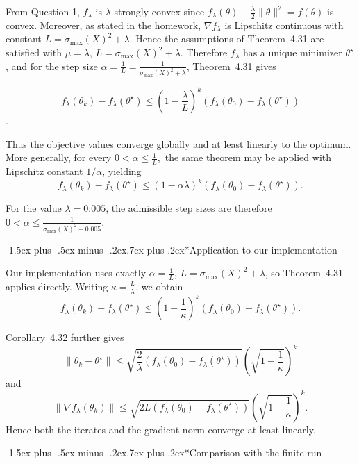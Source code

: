 \documentclass[11pt,a4paper]{article}
\makeatletter
\renewcommand\subsection{\@startsection{subsection}{2}{\z@}%
  {-1.5ex plus -.5ex minus -.2ex}{.7ex plus .2ex}{\normalfont\large\bfseries}}
\makeatother
\begin{document}
From Question 1, \(f_\lambda\) is \(\lambda\)-strongly convex since
\(f_\lambda(\theta)-\frac{\lambda}{2}\|\theta\|^2=f(\theta)\)
is convex. Moreover, as stated in the homework,
\(\nabla f_\lambda\)
is Lipschitz continuous with constant
$L=\sigma_{\max}(X)^2+\lambda$.
Hence the assumptions of Theorem~4.31 are satisfied with
$\mu=\lambda, \, L=\sigma_{\max}(X)^2+\lambda$.
%
Therefore $f_\lambda$ has a unique minimizer $\theta^\star$, and
for the step size
\(\alpha=\frac{1}{L} = \frac{1}{\sigma_{\max}(X)^2+\lambda}\),
Theorem~4.31 gives

\vspace*{-5pt}
$$f_\lambda(\theta_k)-f_\lambda(\theta^\star)
\leq
\left(1-\frac{\lambda}{L}\right)^k
\left(
f_\lambda(\theta_0)-f_\lambda(\theta^\star)
\right)$$.
\vspace*{-7pt}

\noindent Thus the objective values converge globally and at least linearly to
the optimum.
%
More generally, for every
\(0<\alpha\leq\frac{1}{L},\)
the same theorem may be applied with Lipschitz constant \(1/\alpha\),
yielding
\[
f_\lambda(\theta_k)-f_\lambda(\theta^\star)
\leq
(1-\alpha\lambda)^k
\left(
f_\lambda(\theta_0)-f_\lambda(\theta^\star)
\right).
\]

\noindent For the value \(\lambda=0.005\), the admissible step sizes are therefore
\( 0<\alpha\leq \frac{1}{\sigma_{\max}(X)^2+0.005}.\)

\subsection*{Application to our implementation}

Our implementation uses exactly
$\alpha=\frac{1}{L}$, $ L=\sigma_{\max}(X)^2+\lambda$,
so Theorem~4.31 applies directly.
Writing $\kappa=\frac{L}{\lambda}$,
we obtain
\vspace*{-6pt}
$$
f_\lambda(\theta_k)-f_\lambda(\theta^\star)
\leq
\left(1-\frac{1}{\kappa}\right)^k
\left(
f_\lambda(\theta_0)-f_\lambda(\theta^\star)
\right).
$$

Corollary~4.32 further gives
\[
\|\theta_k-\theta^\star\|
\leq
\sqrt{
\frac{2}{\lambda}
\left(
f_\lambda(\theta_0)-f_\lambda(\theta^\star)
\right)
}
\left(
\sqrt{1-\frac{1}{\kappa}}
\right)^k
\]
and
\[
\|\nabla f_\lambda(\theta_k)\|
\leq
\sqrt{
2L
\left(
f_\lambda(\theta_0)-f_\lambda(\theta^\star)
\right)
}
\left(
\sqrt{1-\frac{1}{\kappa}}
\right)^k.
\]
Hence both the iterates and the gradient norm converge at least
linearly.

\subsection*{Comparison with the finite run}
\end{document}
